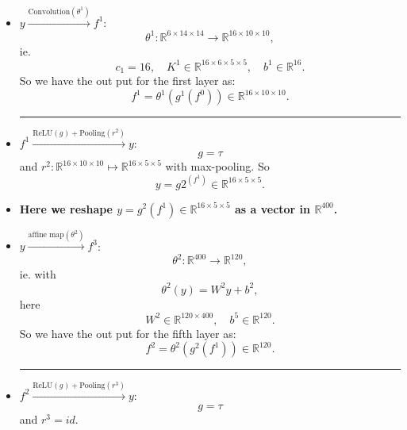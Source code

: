 \begin{itemize}
	\item $y \xrightarrow{\text{Convolution}(\theta^1)} f^1$:
	\begin{equation}
	\theta^1: \mathbb R^{6 \times 14 \times 14} \to \mathbb R^{16 \times 10 \times 10},
	\end{equation}
	ie.
	\begin{equation}
	c_1 = 16, \quad K^1 \in \mathbb R^{16 \times 6 \times 5 \times 5}, \quad b^1 \in \mathbb{R}^{16}.
	\end{equation}
	So we have the out put for the first layer as:
	\begin{equation}
	f^1 = \theta^1(g^1(f^0)) \in \mathbb{R}^{16 \times 10 \times 10}.
	\end{equation}
	
	
	\bigskip \hrule \bigskip
	\item $f^1 \xrightarrow{\text{ReLU}(g) + \text{Pooling}(r^2)} y$: 
	\begin{equation}
	g = \tau 
	\end{equation}
	and $r^2: \mathbb R^{16 \times 10 \times 10} \mapsto \mathbb R^{16 \times 5 \times 5} $ with max-pooling.
	So
	\begin{equation}
	y = g2^(f^1) \in \mathbb R^{16 \times 5 \times 5}.
	\end{equation}
	
	\item {\bf Here we reshape $ y = g^2(f^1) \in \mathbb R^{16 \times 5 \times 5}$ as a vector in $\mathbb{R}^{400}$.}
	
	\item $y \xrightarrow{\text{affine map}(\theta^2) }f^3$: 
	\begin{equation}
	\theta^2: \mathbb R^{400} \to \mathbb R^{120},
	\end{equation}
	ie.
	with 
	\begin{equation}
	\theta^2(y) = W^2 y + b^2,
	\end{equation}
	here 
	\begin{equation}
	W^2 \in \mathbb{R}^{120\times 400}, \quad b^5 \in \mathbb{R}^{120}.
	\end{equation}
	So we have the out put for the fifth layer as:
	\begin{equation}
	f^2 = \theta^2(g^2(f^1)) \in \mathbb{R}^{120}.
	\end{equation}
	
	
	\bigskip \hrule \bigskip
	\item $f^2 \xrightarrow{\text{ReLU}(g) + \text{Pooling}(r^3)} y$: 
	\begin{equation}
	g = \tau 
	\end{equation}
	and $r^3 = id$.
	

\end{itemize}
